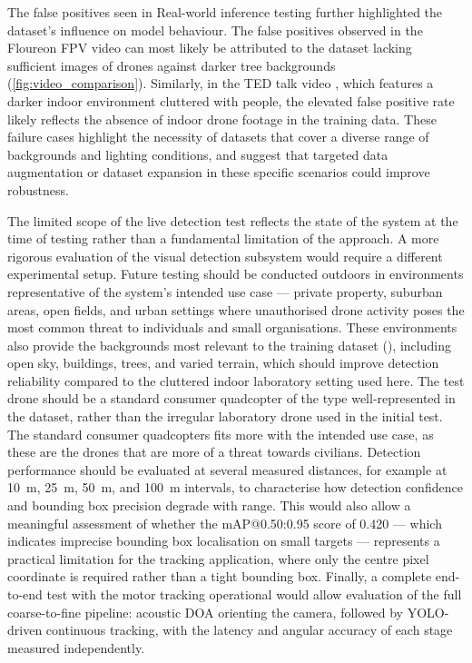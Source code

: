 The false positives seen in Real-world inference testing further highlighted the dataset's influence on model behaviour. The false positives observed in the Floureon FPV video \cite{floureon2017} can most likely be attributed to the dataset lacking sufficient images of drones against darker tree backgrounds \cite{DroneDatasetFinal} (\ref{fig:video_comparison}). Similarly, in the TED talk video \cite{dandrea2016}, which features a darker indoor environment cluttered with people, the elevated false positive rate likely reflects the absence of indoor drone footage in the training data. These failure cases highlight the necessity of datasets that cover a diverse range of backgrounds and lighting conditions, and suggest that targeted data augmentation or dataset expansion in these specific scenarios could improve robustness. 

\vspace{1em}

The limited scope of the live detection test reflects the state of 
the system at the time of testing rather than a fundamental limitation 
of the approach. A more rigorous evaluation of the visual detection 
subsystem would require a different experimental setup. Future testing 
should be conducted outdoors in environments representative of the 
system's intended use case --- private property, suburban areas, 
open fields, and urban settings where unauthorised drone activity 
poses the most common threat to individuals and small organisations. 
These environments also provide the backgrounds most relevant to 
the training dataset (\cite{DroneDatasetFinal}), including open sky, 
buildings, trees, and varied terrain, which should improve detection 
reliability compared to the cluttered indoor laboratory setting 
used here. The test drone should be a standard consumer quadcopter 
of the type well-represented in the dataset, rather than the 
irregular laboratory drone used in the initial test. The standard consumer quadcopters fits more with the intended use case, as these are the drones that are more of a threat towards civilians. Detection 
performance should be evaluated at several measured distances, 
for example at 10~m, 25~m, 50~m, and 100~m intervals, to 
characterise how detection confidence and bounding box precision 
degrade with range. This would also allow a meaningful assessment 
of whether the mAP@0.50:0.95 score of 0.420 --- which indicates 
imprecise bounding box localisation on small targets --- represents 
a practical limitation for the tracking application, where only 
the centre pixel coordinate is required rather than a tight 
bounding box. Finally, a complete end-to-end test with the motor 
tracking operational would allow evaluation of the full 
coarse-to-fine pipeline: acoustic DOA orienting the camera, 
followed by YOLO-driven continuous tracking, with the latency 
and angular accuracy of each stage measured independently.

